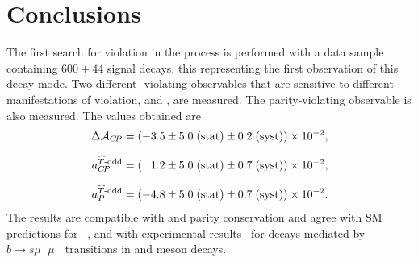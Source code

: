 \section{Conclusions}
The first search for \CP violation in the process \LK is performed with a data sample containing $600\pm 44$ signal decays, this representing the first observation of this \Lb decay mode.
Two different \CP-violating observables that are sensitive to different manifestations of \CP violation, \DACP and \ACP, are measured.
The parity-violating observable \aPTodd is also measured. The values obtained are
\begin{align}
{\ensuremath{\Delta\mathcal{A}_{{C\!P}}}} &=  (-3.5 \pm 5.0\;(\mathrm{stat}) \pm 0.2\;(\mathrm{syst}))\times 10^{-2}, \nonumber\\[1.5ex]
a_{C\!P}^{\widehat{T}\text{-odd}} &= (\phantom{-}1.2 \pm 5.0\;(\mathrm{stat}) \pm 0.7\;(\mathrm{syst}))\times 10^{-2}, \nonumber\\[1.5ex]
{\ensuremath{a_P^{\widehat{T}\text{-odd}}}} &= (-4.8 \pm 5.0\;(\mathrm{stat}) \pm 0.7\;(\mathrm{syst}))\times 10^{-2}.\nonumber
\end{align}
The results are compatible with \CP and parity conservation and agree with SM predictions for \CPV~\cite{Alok:2011gv,Paracha:2014hca}, and with experimental results~\cite{LHCB-PAPER-2014-032,Lees:2012tva} for decays mediated by $b\to s\mu^+\mu^-$ transitions in \Bz and \Bp meson decays.